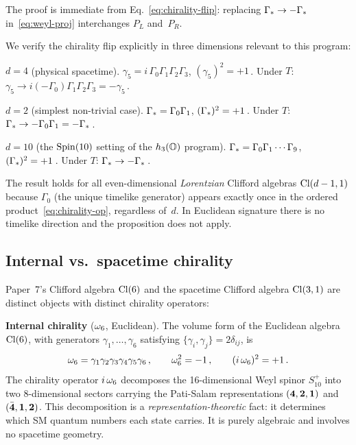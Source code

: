 \noindent
The proof is immediate from Eq.~\eqref{eq:chirality-flip}: replacing
$\Gamma_*\to -\Gamma_*$ in~\eqref{eq:weyl-proj} interchanges
$P_L$ and~$P_R$.

\medskip
We verify the chirality flip explicitly in three dimensions
relevant to this program:

\medskip\noindent
\textbf{$d = 4$} (physical spacetime).
$\gamma_5 = i\,\Gamma_0\Gamma_1\Gamma_2\Gamma_3$,
$(\gamma_5)^2 = +1$\,\checkmark.
Under $T$: $\gamma_5 \to i(-\Gamma_0)\Gamma_1\Gamma_2\Gamma_3
= -\gamma_5$\,\checkmark.

\medskip\noindent
\textbf{$d = 2$} (simplest non-trivial case).
$\Gamma_* = \Gamma_0\Gamma_1$,
$(\Gamma_*)^2 = +1$\,\checkmark.
Under $T$: $\Gamma_* \to -\Gamma_0\Gamma_1
= -\Gamma_*$\,\checkmark.

\medskip\noindent
\textbf{$d = 10$} (the $\mathrm{Spin}(10)$ setting of the $h_3(\mathbb{O})$ program).
$\Gamma_* = \Gamma_0\Gamma_1\cdots\Gamma_9$,
$(\Gamma_*)^2 = +1$\,\checkmark.
Under $T$: $\Gamma_* \to -\Gamma_*$\,\checkmark.

\medskip
The result holds for all even-dimensional \emph{Lorentzian}
Clifford algebras $\mathrm{Cl}(d-1,1)$ because $\Gamma_0$ (the unique
timelike generator) appears exactly once in the ordered
product~\eqref{eq:chirality-op}, regardless of~$d$.  In Euclidean
signature there is no timelike direction and the proposition does
not apply.

\subsection{Internal vs.\ spacetime chirality}
\label{sec:internal-spacetime}

Paper~7's Clifford algebra $\mathrm{Cl}(6)$ and the spacetime Clifford algebra
$\mathrm{Cl}(3,1)$ are distinct objects with distinct chirality operators:

\medskip\noindent
\textbf{Internal chirality} ($\omega_6$, Euclidean).
The volume form of the Euclidean algebra $\mathrm{Cl}(6)$, with generators
$\gamma_1,\ldots,\gamma_6$ satisfying $\{\gamma_i,\gamma_j\} =
2\delta_{ij}$, is~\cite{Paper7}
\begin{equation}\label{eq:omega6-recap}
  \omega_6 = \gamma_1\gamma_2\gamma_3\gamma_4\gamma_5\gamma_6\,,
  \qquad
  \omega_6^2 = -1\,,
  \qquad
  (i\,\omega_6)^2 = +1\,.
\end{equation}
The chirality operator $i\,\omega_6$ decomposes the
16-dimensional Weyl spinor $S_{10}^+$ into two 8-dimensional
sectors carrying the Pati-Salam representations
$(\mathbf{4},\mathbf{2},\mathbf{1})$ and
$(\bar{\mathbf{4}},\mathbf{1},\mathbf{2})$.
This decomposition is a \emph{representation-theoretic} fact: it
determines which SM quantum numbers each state carries.  It is
purely algebraic and involves no spacetime geometry.

